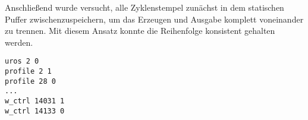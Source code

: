 Anschließend wurde versucht, alle Zyklenstempel zunächst in dem statischen
Puffer zwischenzuspeichern, um das Erzeugen und Ausgabe komplett voneinander zu
trennen. Mit diesem Ansatz konnte die Reihenfolge konsistent gehalten werden.

\begin{code}
\begin{verbatim}
uros 2 0
profile 2 1
profile 28 0
...
w_ctrl 14031 1
w_ctrl 14133 0
\end{verbatim}
\end{code}
